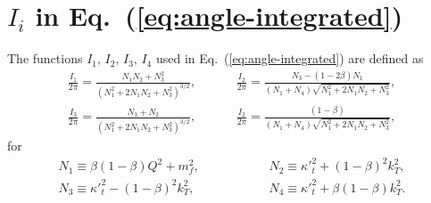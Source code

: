 \documentclass[11pt]{article}
\begin{document}
\appendix
\section{$I_i$ in Eq.~(\ref{eq:angle-integrated})}

The functions $I_1,\, I_2,\,  I_3,\,  I_4$ used in
Eq.~(\ref{eq:angle-integrated}) are defined  as~\cite{Kimber:2001uaa}
%
\begin{equation}
	\begin{split}
		\frac{I_1}{2\pi}=\frac{N_1N_2+N_3^2}{\left( N^2_1+2N_1N_2+N_3^2\right)^{3/2}}, &\hspace{1cm}
		\frac{I_2}{2\pi}=\frac{N_3-(1-2\beta)N_1}{(N_1+N_4)\sqrt{ N^2_1+2N_1N_2+N_3^2}},\\
		\frac{I_3}{2\pi}=\frac{N_1+N_2}{\left( N^2_1+2N_1N_2+N_3^2\right)^{3/2}},&\hspace{1cm}
		\frac{I_2}{2\pi}=\frac{(1-\beta)}{(N_1+N_4)\sqrt{ N^2_1+2N_1N_2+N_3^2}},
	\end{split}
\end{equation}
%
for
%
\begin{equation}
	\begin{split}
		N_1\equiv\beta(1-\beta)Q^2+m_f^2, &\hspace{2cm}
		N_2\equiv{\kappa'}_t^2+(1-\beta)^2k_T^2,\\
		N_3\equiv{\kappa'}_t^2-(1-\beta)^2k_T^2, &\hspace{2cm}
		N_4\equiv{\kappa'}_t^2+\beta(1-\beta)k_T^2.
	\end{split}
\end{equation}



%



%
% 

%
\end{document}
